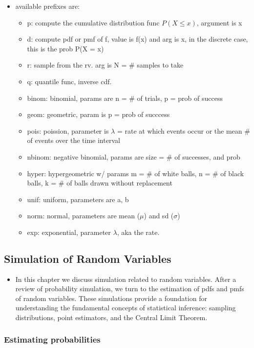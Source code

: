 \documentclass[
]{article}
\providecommand{\tightlist}{%
  \setlength{\itemsep}{0pt}\setlength{\parskip}{0pt}}
\begin{document}
\begin{itemize}
\begin{itemize}
    \begin{itemize}
    \tightlist
    \item
      available prefixes are:

      \begin{itemize}
      \tightlist
      \item
        p: compute the cumulative distribution func \(P(X \le x)\),
        argument is x
      \item
        d: compute pdf or pmf of f, value is f(x) and arg is x, in the
        discrete case, this is the prob P(X = x)
      \item
        r: sample from the rv. arg is N = \# samples to take
      \item
        q: quantile func, inverse cdf.
      \item
        binom: binomial, params are n = \# of trials, p = prob of
        success
      \item
        geom: geometric, param is p = prob of succcess
      \item
        pois: poission, parameter is \(\lambda\) = rate at which events
        occur or the mean \# of events over the time interval
      \item
        nbinom: negative binomial, params are size = \# of successes,
        and prob
      \item
        hyper: hypergeometric w/ params m = \# of white balls, n = \# of
        black balls, k = \# of balls drawn without replacement
      \item
        unif: uniform, parameters are a, b
      \item
        norm: normal, parameters are mean (\(\mu\)) and sd (\(\sigma\))
      \item
        exp: exponential, parameter \(\lambda\), aka the rate.
      \end{itemize}
    \end{itemize}
  \end{itemize}
\end{itemize}

\hypertarget{simulation-of-random-variables}{%
\subsection{Simulation of Random
Variables}\label{simulation-of-random-variables}}

\begin{itemize}
\tightlist
\item
  In this chapter we discuss simulation related to random variables.
  After a review of probability simulation, we turn to the estimation of
  pdfs and pmfs of random variables. These simulations provide a
  foundation for understanding the fundamental concepts of statistical
  inference: sampling distributions, point estimators, and the Central
  Limit Theorem.
\end{itemize}

\hypertarget{estimating-probabilities}{%
\subsubsection{Estimating
probabilities}\label{estimating-probabilities}}
\end{document}
